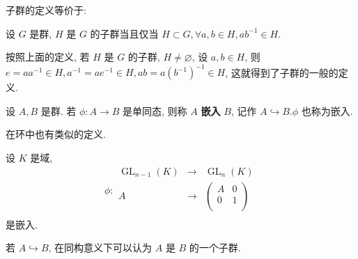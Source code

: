 \documentclass{ctexart}
\begin{document}
子群的定义等价于:
\begin{definition}
    设 $G$ 是群, $H$ 是 $G$ 的子群当且仅当 $H\subset G,\forall a,b\in H,ab^{-1}\in H$.
\end{definition}
按照上面的定义, 若 $H$ 是 $G$ 的子群, $H\neq\varnothing$, 设 $a,b\in H$, 则 $e=aa^{-1}\in H,a^{-1}=ae^{-1}\in H,ab=a(b^{-1})^{-1}\in H$, 这就得到了子群的一般的定义.
\begin{definition}
    设 $A,B$ 是群. 若 $\phi:A\to B$ 是单同态, 则称 $A$ \textbf{嵌入} $B$, 记作 $A\hookrightarrow B.\phi$ 也称为嵌入.
\end{definition}
在环中也有类似的定义.
\begin{example}
    设 $K$ 是域,
    \[\phi:\begin{array}{rcl}
        \operatorname{GL}_{n-1}(K) & \to & \operatorname{GL}_n(K) \\
        A & \to & \begin{pmatrix}
            A & 0 \\
            0 & 1 \\
        \end{pmatrix} \\
    \end{array}\]
    是嵌入.
\end{example}
若 $A\hookrightarrow B$, 在同构意义下可以认为 $A$ 是 $B$ 的一个子群.
\end{document}
